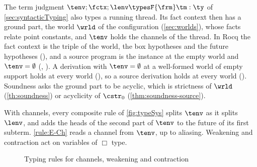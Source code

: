 The term judgment $\tenv ; \fctx ; \lenv \typesF{\frm} \tm : \ty$ of
\cref{sec:syntacticTyping} also types a running thread. Its fact context
then has a ground part, the world $\wrld$ of the configuration
(\cref{sec:worlds}), whose facts relate point constants, and $\tenv$ holds
the channels of the thread. In Rocq the fact context is the triple of the
world, the box hypotheses and the future hypotheses (), and a
source program is the instance at the empty world and $\tenv = \emptyset$
(, ). A derivation with $\tenv = \emptyset$ at a
well-formed world of empty support holds at every world
(), so a source derivation holds at every
world (). Soundness asks the
ground part to be acyclic, which is strictness of $\wrld$
(\cref{th:soundness}) or acyclicity of $\cstr_0$
(\cref{thm:soundness-source}).

With channels, every composite rule of
\cref{fig:typeSys} splits $\tenv$ as it splits $\lenv$, and adds the
heads of the second part of $\tenv$ to the future of its first subterm.
\ref{rule:E-Ch} reads a channel from $\tenv$, up to aliasing. Weakening
and contraction act on variables of $\Box$ type.

\begin{figure}[tp]
  \adjustfigure[]
  \caption{Typing rules for channels, weakening and contraction}
  \label{fig:typeSysStruct}
\end{figure}

